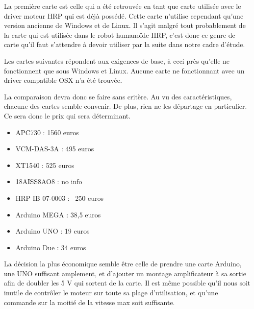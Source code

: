 \documentclass[11pt]{report}
\begin{document}
La première carte est celle qui a été retrouvée en tant que carte utilisée avec 
le driver moteur HRP qui est déjà possédé. Cette carte n'utilise cependant 
qu'une version ancienne de Windows et de Linux. Il s'agit malgré tout 
probablement de la carte qui est utilisée dans le robot humanoïde HRP, c'est 
donc ce genre de carte qu'il faut s'attendre à devoir utiliser par la suite dans 
notre cadre d'étude.

Les cartes suivantes répondent aux exigences de base, à ceci près qu'elle ne 
fonctionnent que sous Windows et Linux. Aucune carte ne fonctionnant avec un 
driver compatible OSX n'a été trouvée. 

La comparaison devra donc se faire sans critère. Au vu des caractéristiques, 
chacune des cartes semble convenir. De plus, rien ne les départage en 
particulier. Ce sera donc le prix qui sera déterminant.

\begin{itemize}
  
  \item{APC730 : 1560 euros}

  \item{VCM-DAS-3A : 495 euros}
  
  \item{XT1540 : 525 euros}
  
  \item{18AISS8AO8 : no info}
  
  \item{HRP IB 07-0003 : ~250 euros}

\item{Arduino MEGA : 38,5 euros}

\item{Arduino UNO : 19 euros}

\item{Arduino Due : 34 euros}
  
  \end{itemize}



La décision la plus économique semble être celle de prendre une carte Arduino, 
une UNO suffisant amplement, et d'ajouter un montage amplificateur à sa 
sortie afin de doubler les 5 V qui sortent de la carte. Il est même possible 
qu'il nous soit inutile de contrôler le moteur sur toute sa plage d'utilisation, 
et qu'une commande sur la moitié de la vitesse max soit suffisante.
\end{document}
